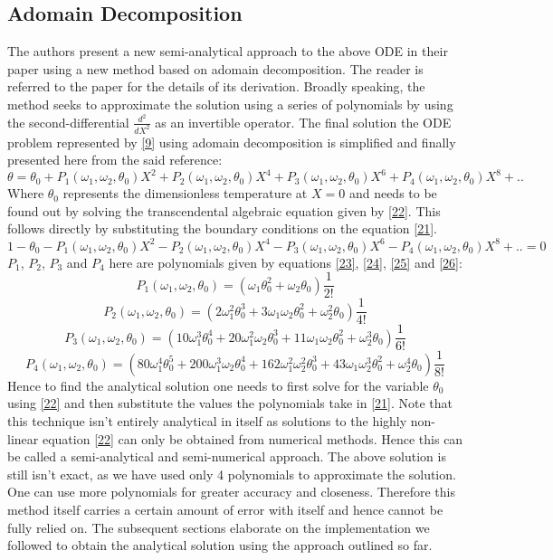 \documentclass[12pt]{article}
\begin{document}
\subsection{Adomain Decomposition}
The authors present a new semi-analytical approach to the above ODE in their paper using a new method based on adomain decomposition. The reader is referred to the paper for the details of its derivation. Broadly speaking, the method seeks to approximate the solution using a series of polynomials by using the second-differential $\frac{d^2}{dX^2}$ as an invertible operator. The final solution the ODE problem represented by \eqref{9} using adomain decomposition is simplified and finally presented here from the said reference: 
\[
\theta = \theta_0 + P_1(\omega_1,\omega_2, \theta_0) X^2 + 
                    P_2(\omega_1,\omega_2, \theta_0) X^4 +
                    P_3(\omega_1,\omega_2, \theta_0) X^6 +
                    P_4(\omega_1,\omega_2, \theta_0) X^8+ ..  \tag{21} \label{21}
\]
Where $\theta_0$ represents the dimensionless temperature at $X=0$ and needs to be found out by solving the transcendental algebraic equation given by \eqref{22}. This follows directly by substituting the boundary conditions on the equation \eqref{21}.  
\[
1 - \theta_0  - P_1(\omega_1,\omega_2, \theta_0) X^2 - 
                    P_2(\omega_1,\omega_2, \theta_0) X^4 -
                    P_3(\omega_1,\omega_2, \theta_0) X^6 -
                    P_4(\omega_1,\omega_2, \theta_0) X^8+ .. = 0  \tag{22} \label{22}
\]
$P_1$, $P_2$, $P_3$ and $P_4$ here are polynomials given by equations \eqref{23}, \eqref{24}, \eqref{25} and \eqref{26}: 
\[
P_1(\omega_1,\omega_2,\theta_0) = (\omega_1 \theta_0^2 + \omega_2 \theta_0) \frac{1}{2!} \tag{23} \label{23}
\]
\[
P_2(\omega_1,\omega_2,\theta_0) = (2 \omega_1^2 \theta_0^3 + 3\omega_1 \omega_2 \theta_0^2 + \omega_2^2 \theta_0)\frac{1}{4!} \tag{24} \label{24}
\]
\[
P_3(\omega_1,\omega_2,\theta_0) = (10 \omega_1^3 \theta_0^4 + 20 \omega_1^2\omega_2 \theta_0^3 + 11 \omega_1 \omega_2 \theta_0^2 + \omega_2^3 \theta_0)\frac{1}{6!} \tag{25} \label{25}
\]
\[
P_4(\omega_1,\omega_2,\theta_0) = (80 \omega_1^4 \theta_0^5 + 200 \omega_1^3 \omega_2 \theta_0^4 + 162 \omega_1^2 \omega_2^2 \theta_0^3 + 43 \omega_1 \omega_2^3 \theta_0^2 + \omega_2^4 \theta_0)\frac{1}{8!}\tag{26} \label{26}
\]
Hence to find the analytical solution one needs to first solve for the variable $\theta_0$ using \eqref{22} and then substitute the values the polynomials take in \eqref{21}. Note that this technique isn't entirely analytical in itself as solutions to the highly non-linear equation \eqref{22} can only be obtained from numerical methods. Hence this can be called a semi-analytical and semi-numerical approach. The above solution is still isn't exact, as we have used only 4 polynomials to approximate the solution. One can use more polynomials for greater accuracy and closeness. Therefore this method itself carries a certain amount of error with itself and hence cannot be fully relied on. The subsequent sections elaborate on the implementation we followed to obtain the analytical solution using the approach outlined so far. 
\end{document}
